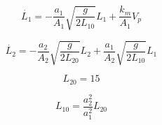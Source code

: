 \documentclass[a4paper,11pt]{article}
\title{}
\author{}
\begin{document}
\begin{equation}
\dot{L_{1}} = -\frac{a_{1}}{A_{1}}
\sqrt{\frac{g}{2L_{10}}}L_{1}+\frac{k_{m}}{A_{1}}
V_{p}
\end{equation}

\begin{equation}
\dot{L_{2}} = -\frac{a_{2}}{A_{2}}
\sqrt{\frac{g}{2L_{20}}}L_{2}+
\frac{a_{1}}{A_{2}}
\sqrt{\frac{g}{2L_{10}}}L_{1}
\end{equation}

\begin{equation}
L_{20} = 15
\end{equation}

\begin{equation}
L_{10} = \frac{a^{2}_{2}}{a^{2}_{1}}L_{20}
\end{equation}
\end{document}
